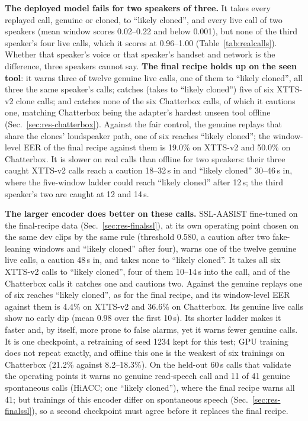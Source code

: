 \textbf{The deployed model fails for two speakers of three.} It takes every replayed call,
genuine or cloned, to ``likely cloned'', and every live call of two speakers (mean window
scores 0.02--0.22 and below 0.001), but none of the third speaker's four live calls, which it
scores at 0.96--1.00 (Table~\ref{tab:realcalls}). Whether that speaker's voice or that speaker's
handset and network is the difference, three speakers cannot say. \textbf{The final recipe holds up on
the seen tool}: it warns three of twelve genuine live calls, one of them to ``likely cloned'',
all three the same speaker's calls; catches (takes to ``likely cloned'') five of six XTTS-v2
clone calls; and catches none of the six Chatterbox calls, of which it cautions one, matching
Chatterbox being the adapter's hardest unseen tool offline (Sec.~\ref{sec:res-chatterbox}).
Against the fair control, the genuine replays that share the clones' loudspeaker path, one of
six reaches ``likely cloned''; the window-level EER of the final recipe against them is 19.0\%
on XTTS-v2 and 50.0\% on Chatterbox. It is slower on real calls than offline for two speakers:
their three caught XTTS-v2 calls reach a caution 18--32\,s in and ``likely cloned'' 30--46\,s
in, where the five-window ladder could reach ``likely cloned'' after 12\,s; the third speaker's two are caught at
12 and 14\,s.

\textbf{The larger encoder does better on these calls.} SSL-AASIST fine-tuned on the
final-recipe data (Sec.~\ref{sec:res-finalssl}), at its own operating point chosen on the same
dev clips by the same rule (threshold 0.580, a caution after two fake-leaning windows and
``likely cloned'' after four), warns one of the twelve genuine live calls, a caution 48\,s in,
and takes none to ``likely cloned''. It takes all six XTTS-v2 calls to ``likely cloned'', four
of them 10--14\,s into the call, and of the Chatterbox calls it catches one and cautions two.
Against the genuine replays one of six reaches ``likely cloned'', as for the final recipe, and
its window-level EER against them is 4.4\% on XTTS-v2 and 36.6\% on Chatterbox. Its genuine
live calls show no early dip (mean 0.98 over the first 10\,s). Its shorter ladder makes it
faster and, by itself, more prone to false alarms, yet it warns fewer genuine calls. It is one
checkpoint, a retraining of seed 1234 kept for this test; GPU training does not repeat
exactly, and offline this one is the weakest of six trainings on Chatterbox (21.2\% against
8.2--18.3\%). On the held-out 60\,s calls that validate the operating points it warns no genuine
read-speech call and 11 of 41 genuine spontaneous calls (HiACC; one ``likely cloned''), where
the final recipe warns all 41; but trainings of this encoder differ on spontaneous speech
(Sec.~\ref{sec:res-finalssl}), so a second checkpoint must agree before it replaces the final
recipe.

